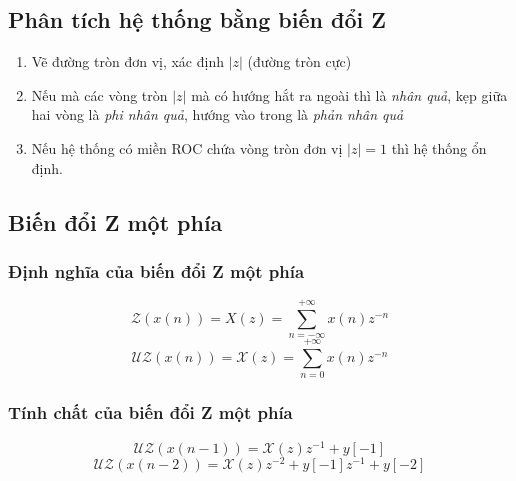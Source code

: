 \documentclass{article}
\begin{document}
\subsection{Phân tích hệ thống bằng biến đổi Z}
\begin{enumerate}
    \item Vẽ đường tròn đơn vị, xác định $|z|$ (đường tròn cực)
    \item Nếu mà các vòng tròn $|z|$ mà có hướng hắt ra ngoài thì là \textit{nhân quả}, kẹp giữa hai vòng là \textit{phi nhân quả}, hướng vào trong là \textit{phản nhân quả}
    \item Nếu hệ thống có miền ROC chứa vòng tròn đơn vị $|z|=1$ thì hệ thống ổn định.
\end{enumerate}
\subsection{Biến đổi Z một phía}
\subsubsection{Định nghĩa của biến đổi Z một phía}
$$\mathscr{Z}(x(n))=X(z)=\sum_{n=-\infty}^{+\infty}x(n)z^{-n}$$
$$\mathscr{UZ}(x(n))=\mathscr{X}(z)=\sum_{n=0}^{+\infty}x(n)z^{-n}$$
\subsubsection{Tính chất của biến đổi Z một phía}
$$\mathscr{UZ}(x(n-1))=\mathscr{X}(z)z^{-1}+y[-1]$$
$$\mathscr{UZ}(x(n-2))=\mathscr{X}(z)z^{-2}+y[-1]z^{-1}+y[-2]$$
\end{document}
